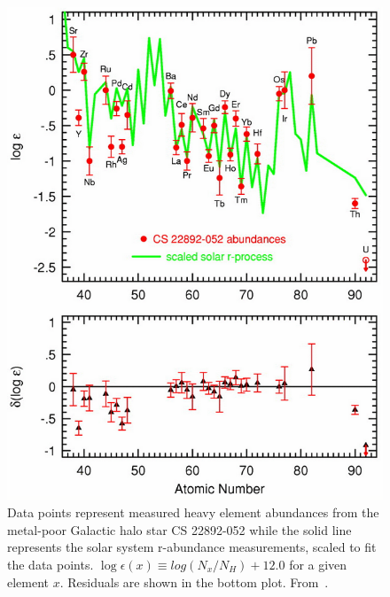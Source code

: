 {%
\begin{figure}
\includegraphics[width=\linewidth]{pdf/oldstar.png}
\caption{\label{fig:old} Data points represent measured heavy element
abundances from the metal-poor Galactic halo star CS 22892-052 while
the solid line represents the solar system r-abundance measurements,
scaled to fit the data points.  $\log \epsilon (x) \equiv log(N_x/N_H) +
12.0$ for a given element $x$.  Residuals are shown in the bottom
plot.  From~\cite{truranetal2002}.}
\end{figure}

}
